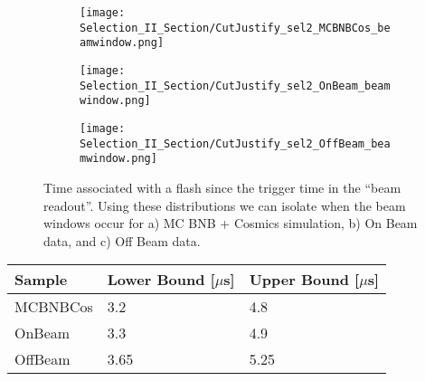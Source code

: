 \documentclass{article}
\begin{document}
\begin{figure}[h!]
\begin{subfigure}[b]{0.3\textwidth}
\texttt{[image: Selection\_II\_Section/CutJustify\_sel2\_MCBNBCos\_beamwindow.png]}
\caption{ }
\end{subfigure}
\hspace{3mm}
\begin{subfigure}[b]{0.3\textwidth}
\texttt{[image: Selection\_II\_Section/CutJustify\_sel2\_OnBeam\_beamwindow.png]}
\caption{ }
\end{subfigure}
\hspace{3mm}
\begin{subfigure}[b]{0.3\textwidth}
\texttt{[image: Selection\_II\_Section/CutJustify\_sel2\_OffBeam\_beamwindow.png]}
\caption{ }
\end{subfigure}
\caption{Time associated with a flash since the trigger time in the ``beam readout''. Using these distributions we can isolate when the beam windows occur for a) MC BNB + Cosmics simulation, b) On Beam data, and c) Off Beam data.}
\label{fig:misc_beamwindows}
\end{figure}

\begin{table} 
 \centering
 \begin{tabular}{| l | l | l |}
  \hline
 Sample & Lower Bound [$\mu$s] & Upper Bound [$\mu$s] \\ [0.1ex] \hline
MCBNBCos & 3.2 & 4.8 \\ 
OnBeam & 3.3 & 4.9   \\ 
OffBeam & 3.65 & 5.25 \\ \hline
\end{tabular}
\end{table}


\end{document}
